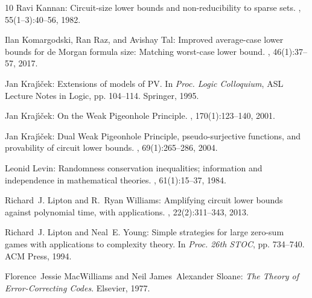 \documentclass[11pt]{article}
\numberwithin{equation}{section}
\theoremstyle{definition}
\theoremstyle{plain}
\begin{document}
\begin{thebibliography}{10}
{\sc Ravi Kannan}: Circuit-size lower bounds and non-reducibility to sparse
  sets.
, 55(1--3):40--56, 1982.
\newblock [\epfmtdoi{10.1016/S0019-9958(82)90382-5}]

{\sc Ilan Komargodski, Ran Raz, and Avishay Tal}: Improved average-case lower
  bounds for de {M}organ formula size: {M}atching worst-case lower bound.
, 46(1):37--57, 2017.
\newblock [\epfmtdoi{10.1137/15M1048045}]

{\sc Jan Kraj{\'\i}{\v{c}}ek}: Extensions of models of {PV}.
\newblock In {\em Proc. {L}ogic {C}olloquium}, ASL Lecture Notes in Logic, pp.
  104--114. Springer, 1995.
\newblock [\epfmtdoi{10.1017/9781316716830.011}]

{\sc Jan Kraj{\'\i}{\v{c}}ek}: On the {W}eak {P}igeonhole {P}rinciple.
, 170(1):123--140, 2001.
\newblock [\epfmtdoi{10.4064/fm170-1-8}]

{\sc Jan Kraj{\'\i}{\v{c}}ek}: Dual {W}eak {P}igeonhole {P}rinciple,
  pseudo-surjective functions, and provability of circuit lower bounds.
, 69(1):265--286, 2004.

{\sc Leonid Levin}: Randomness conservation inequalities; information and
  independence in mathematical theories.
, 61(1):15--37, 1984.
\newblock [\epfmtdoi{10.1016/S0019-9958(84)80060-1}]

{\sc Richard~J. Lipton and R.~Ryan Williams}: Amplifying circuit lower bounds
  against polynomial time, with applications.
, 22(2):311--343, 2013.
\newblock [\epfmtdoi{10.1007/s00037-013-0069-5}]

{\sc Richard~J. Lipton and Neal~E. Young}: Simple strategies for large zero-sum
  games with applications to complexity theory.
\newblock In {\em Proc. 26th STOC}, pp. 734--740. ACM Press, 1994.
\newblock [\epfmtdoi{10.1145/195058.195447}]

{\sc Florence~Jessie MacWilliams and Neil James~Alexander Sloane}: {\em The
  Theory of Error-Correcting Codes}.
\newblock Elsevier, 1977.


\end{thebibliography}
\end{document}
